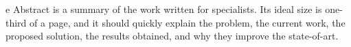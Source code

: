 e Abstract is a summary of the work written for specialists. Its ideal size is
one-third of a page, and it should quickly explain the problem, the current
work, the proposed solution, the results obtained, and why they improve the
state-of-art.
